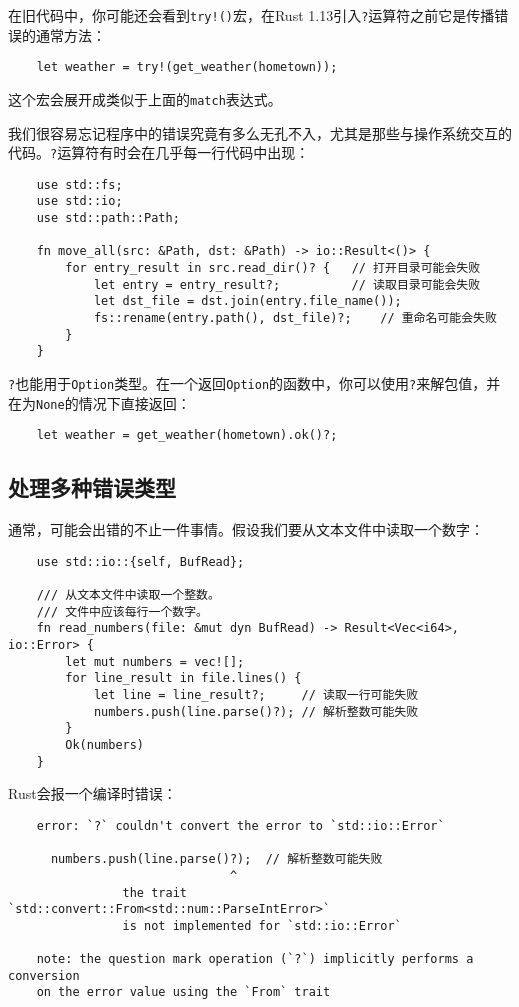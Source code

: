 在旧代码中，你可能还会看到\texttt{try!()}宏，在Rust 1.13引入\texttt{?}运算符之前它是传播错误的通常方法：
\begin{verbatim}
    let weather = try!(get_weather(hometown));
\end{verbatim}
这个宏会展开成类似于上面的\texttt{match}表达式。

我们很容易忘记程序中的错误究竟有多么无孔不入，尤其是那些与操作系统交互的代码。\texttt{?}运算符有时会在几乎每一行代码中出现：
\begin{verbatim}
    use std::fs;
    use std::io;
    use std::path::Path;

    fn move_all(src: &Path, dst: &Path) -> io::Result<()> {
        for entry_result in src.read_dir()? {   // 打开目录可能会失败
            let entry = entry_result?;          // 读取目录可能会失败
            let dst_file = dst.join(entry.file_name());
            fs::rename(entry.path(), dst_file)?;    // 重命名可能会失败
        }
    }
\end{verbatim}

\texttt{?}也能用于\texttt{Option}类型。在一个返回\texttt{Option}的函数中，你可以使用\texttt{?}来解包值，并在为\texttt{None}的情况下直接返回：
\begin{verbatim}
    let weather = get_weather(hometown).ok()?;
\end{verbatim}

\subsection{处理多种错误类型}\label{MultiErr}
通常，可能会出错的不止一件事情。假设我们要从文本文件中读取一个数字：
\begin{verbatim}
    use std::io::{self, BufRead};

    /// 从文本文件中读取一个整数。
    /// 文件中应该每行一个数字。
    fn read_numbers(file: &mut dyn BufRead) -> Result<Vec<i64>, io::Error> {
        let mut numbers = vec![];
        for line_result in file.lines() {
            let line = line_result?;     // 读取一行可能失败
            numbers.push(line.parse()?); // 解析整数可能失败
        }
        Ok(numbers)
    }
\end{verbatim}

Rust会报一个编译时错误：
\begin{verbatim}
    error: `?` couldn't convert the error to `std::io::Error`

      numbers.push(line.parse()?);  // 解析整数可能失败
                               ^
                the trait `std::convert::From<std::num::ParseIntError>`
                is not implemented for `std::io::Error`

    note: the question mark operation (`?`) implicitly performs a conversion
    on the error value using the `From` trait
\end{verbatim}

